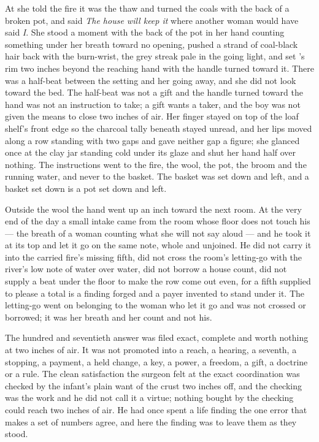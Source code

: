 At  she told the fire it was the thaw and turned the coals with the back of a broken pot, and said \emph{The house will keep it} where another woman would have said \emph{I}. She stood a moment with the back of the pot in her hand counting something under her breath toward no opening, pushed a strand of coal-black hair back with the burn-wrist, the grey streak pale in the going light, and set 's rim two inches beyond the reaching hand with the handle turned toward it. There was a half-beat between the setting and her going away, and she did not look toward the bed. The half-beat was not a gift and the handle turned toward the hand was not an instruction to take; a gift wants a taker, and the boy was not given the means to close two inches of air. Her finger stayed on top of the loaf shelf's front edge so the charcoal tally beneath stayed unread, and her lips moved along a row standing with two gaps and gave neither gap a figure; she glanced once at the clay jar standing cold under its glaze and shut her hand half over nothing. The instructions went to the fire, the wool, the pot, the broom and the running water, and never to the basket. The basket was set down and left, and a basket set down is a pot set down and left.

Outside the wool the hand went up an inch toward the next room. At the very end of the day a small intake came from the room whose floor does not touch his --- the breath of a woman counting what she will not say aloud --- and he took it at its top and let it go on the same note, whole and unjoined. He did not carry it into the carried fire's missing fifth, did not cross the room's letting-go with the river's low note of water over water, did not borrow a house count, did not supply a beat under the floor to make the row come out even, for a fifth supplied to please a total is a finding forged and a payer invented to stand under it. The letting-go went on belonging to the woman who let it go and was not crossed or borrowed; it was her breath and her count and not his.

The hundred and seventieth answer was filed exact, complete and worth nothing at two inches of air. It was not promoted into a reach, a hearing, a seventh, a stopping, a payment, a held change, a key, a power, a freedom, a gift, a doctrine or a rule. The clean satisfaction the surgeon felt at the exact coordination was checked by the infant's plain want of the crust two inches off, and the checking was the work and he did not call it a virtue; nothing bought by the checking could reach two inches of air. He had once spent a life finding the one error that makes a set of numbers agree, and here the finding was to leave them as they stood.


